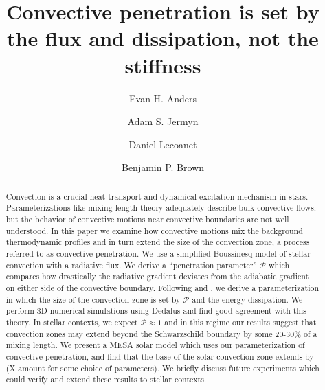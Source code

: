 \documentclass{aastex631}
\newcommand{\mP}{\ensuremath{\mathcal{P}}}
\begin{document}
\title{Convective penetration is set by the flux and dissipation, not the stiffness}
\author[0000-0002-3433-4733]{Evan H. Anders}
\author[0000-0001-5048-9973]{Adam S. Jermyn}
\author[0000-0002-7635-9728]{Daniel Lecoanet}
\author[0000-0001-8935-219X]{Benjamin P. Brown}


\begin{abstract}
Convection is a crucial heat transport and dynamical excitation mechanism in stars.
Parameterizations like mixing length theory adequately describe bulk convective flows, but the behavior of convective motions near convective boundaries are not well understood.
In this paper we examine how convective motions mix the background thermodynamic profiles and in turn extend the size of the convection zone, a process referred to as convective penetration.
We use a simplified Boussinesq model of stellar convection with a radiative flux.
We derive a ``penetration parameter'' $\mathcal{P}$ which compares how drastically the radiative gradient deviates from the adiabatic gradient on either side of the convective boundary.
Following \citet{roxburgh1989} and \citet{zahn1991}, we derive a parameterization in which the size of the convection zone is set by $\mP$ and the energy dissipation.
We perform 3D numerical simulations using Dedalus and find good agreement with this theory.
In stellar contexts, we expect $\mathcal{P} \approx 1$ and in this regime our results suggest that convection zones may extend beyond the Schwarzschild boundary by some 20-30\% of a mixing length.
We present a MESA solar model which uses our parameterization of convective penetration, and find that the base of the solar convection zone extends by (X amount for some choice of parameters).
We briefly discuss future experiments which could verify and extend these results to stellar contexts.
\end{abstract}
\end{document}
